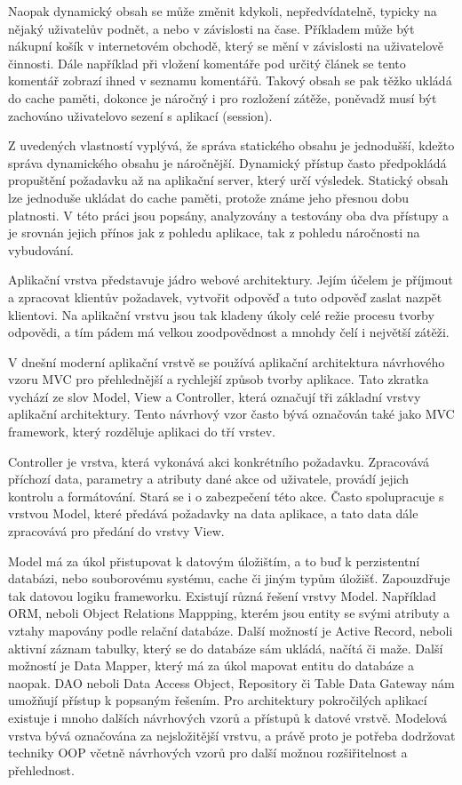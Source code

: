 \documentclass[12pt]{article}
\begin{document}
Naopak dynamický obsah se může změnit kdykoli, nepředvídatelně, typicky na nějaký uživatelův podnět, a nebo v závislosti na čase. Příkladem může být nákupní košík v internetovém obchodě, který se mění v závislosti na uživatelově činnosti. Dále například při vložení komentáře pod určitý článek se tento komentář zobrazí ihned v seznamu komentářů. Takový obsah se pak těžko ukládá do cache paměti, dokonce je náročný i pro rozložení zátěže, poněvadž musí být zachováno uživatelovo sezení s aplikací (session).

Z uvedených vlastností vyplývá, že správa statického obsahu je jednodušší, kdežto správa dynamického obsahu je náročnější. Dynamický přístup často předpokládá propuštění požadavku až na aplikační server, který určí výsledek. Statický obsah lze jednoduše ukládat do cache paměti, protože známe jeho přesnou dobu platnosti. V této práci jsou popsány, analyzovány a testovány oba dva přístupy a je srovnán jejich přínos jak z pohledu aplikace, tak z pohledu náročnosti na vybudování.

Aplikační vrstva představuje jádro webové architektury. Jejím účelem je příjmout a zpracovat klientův požadavek, vytvořit odpověď a tuto odpověď zaslat nazpět klientovi. Na aplikační vrstvu jsou tak kladeny úkoly celé režie procesu tvorby odpovědi, a tím pádem má velkou zoodpovědnost a mnohdy čelí i největší zátěži.

V dnešní moderní aplikační vrstvě se používá aplikační architektura návrhového vzoru MVC pro přehlednější a rychlejší způsob tvorby aplikace. Tato zkratka vychází ze slov Model, View a Controller, která označují tři základní vrstvy aplikační architektury. Tento návrhový vzor často bývá označován také jako MVC framework, který rozděluje aplikaci do tří vrstev. \cite{design-patterns}

Controller je vrstva, která vykonává akci konkrétního požadavku. Zpracovává příchozí data, parametry a atributy dané akce od uživatele, provádí jejich kontrolu a formátování. Stará se i o zabezpečení této akce. Často spolupracuje s vrstvou Model, které předává požadavky na data aplikace, a tato data dále zpracovává pro předání do vrstvy View. \cite{design-patterns}

Model má za úkol přistupovat k datovým úložištím, a to buď k perzistentní databázi, nebo souborovému systému, cache či jiným typům úložišť. Zapouzdřuje tak datovou logiku frameworku. Existují různá řešení vrstvy Model. Například ORM, neboli Object Relations Mappping, kterém jsou entity se svými atributy a vztahy mapovány podle relační databáze. Další možností je Active Record, neboli aktivní záznam tabulky, který se do databáze sám ukládá, načítá či maže. Další možností je Data Mapper, který má za úkol mapovat entitu do databáze a naopak. DAO neboli Data Access Object, Repository či Table Data Gateway nám umožňují přístup k popsaným řešením. Pro architektury pokročilých aplikací existuje i mnoho dalších návrhových vzorů a přístupů k datové vrstvě. Modelová vrstva bývá označována za nejsložitější vrstvu, a právě proto je potřeba dodržovat techniky OOP včetně návrhových vzorů pro další možnou rozšiřitelnost a přehlednost. \cite{design-patterns}
\end{document}

